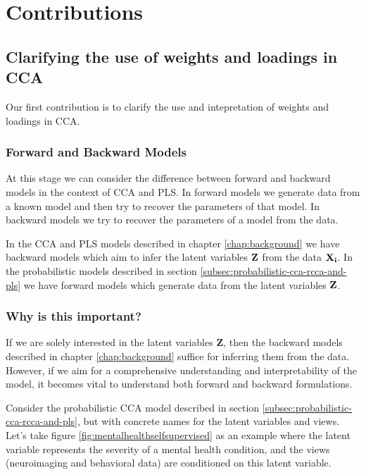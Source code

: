 \section{Contributions}\label{sec:contributions}

\subsection{Clarifying the use of weights and loadings in CCA}

Our first contribution is to clarify the use and intepretation of weights and loadings in CCA.

\subsubsection{Forward and Backward Models}

At this stage we can consider the difference between forward and backward models in the context of CCA and PLS.
In forward models we generate data from a known model and then try to recover the parameters of that model.
In backward models we try to recover the parameters of a model from the data.

In the CCA and PLS models described in chapter \ref{chap:background} we have backward models which aim to infer the
latent variables $\bold{Z}$ from the data $\bold{X_i}$.
In the probabilistic models described in section \ref{subsec:probabilistic-cca-rcca-and-pls} we have forward models which
generate data from the latent variables $\bold{Z}$.

\subsubsection{Why is this important?}

If we are solely interested in the latent variables $\boldsymbol{Z}$, then the backward models described in chapter \ref{chap:background} suffice for inferring them from the data.
However, if we aim for a comprehensive understanding and interpretability of the model, it becomes vital to understand both forward and backward formulations.

Consider the probabilistic CCA model described in section \ref{subsec:probabilistic-cca-rcca-and-pls}, but with concrete names for the latent variables and views. Let's take figure \ref{fig:mentalhealthselfsupervised} as an example where the latent variable represents the severity of a mental health condition, and the views (neuroimaging and behavioral data) are conditioned on this latent variable.


